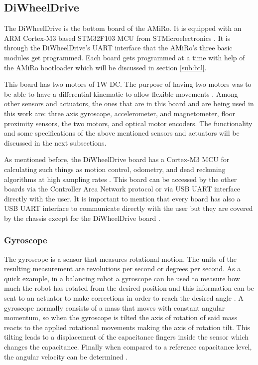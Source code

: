 \documentclass[12pt]{report}%
\begin{document}
\subsection{DiWheelDrive}
\label{sub:DWD}
The DiWheelDrive is the bottom board of the AMiRo. It is equipped with an ARM Cortex-M3 based STM32F103 MCU from STMicroelectronics \cite{AMiRo_paper_modular}. It is through the DiWheelDrive's UART interface that the AMiRo's three basic modules get programmed. Each board gets programmed at a time with help of the AMiRo bootloader which will be discussed in section \ref{sub:btl}.

This board has two motors of 1W DC. The purpose of having two motors was to be able to have a differential kinematic to allow flexible movements \cite{AMiRo_paper_modular}. Among other sensors and actuators, the ones that are in this board and are being used in this work are: three axis gyroscope, accelerometer, and magnetometer, floor proximity sensors, the two motors, and optical motor encoders. The functionality and some specifications of the above mentioned sensors and actuators will be discussed in the next subsections.

As mentioned before, the DiWheelDrive board has a Cortex-M3 MCU for calculating such things as motion control, odometry, and dead reckoning algorithms at high sampling rates \cite{AMiRo_paper_modular}. This board can be accessed by the other boards via the Controller Area Network protocol or via USB UART interface directly with the user. It is important to mention that every board has also a USB UART interface to communicate directly with the user but they are covered by the chassis except for the DiWheelDrive board \cite{AMiRo_paper_modular}.

\subsubsection{Gyroscope}
The gyroscope is a sensor that measures rotational motion. The units of the resulting measurement are revolutions per second or degrees per second. As a quick example, in a balancing robot a gyroscope can be used to measure how much the robot has rotated from the desired position and this information can be sent to an actuator to make corrections in order to reach the desired angle \cite{gyrostheory}. A gyroscope normally consists of a mass that moves with constant angular momentum, so when the gyroscope is tilted the axis of rotation of said mass reacts to the applied rotational movements making the axis of rotation tilt. This tilting leads to a displacement of the capacitance fingers inside the sensor which changes the capacitance. Finally when compared to a reference capacitance level, the angular velocity can be determined \cite{AMiRo_ppt_v1}.
\end{document}
